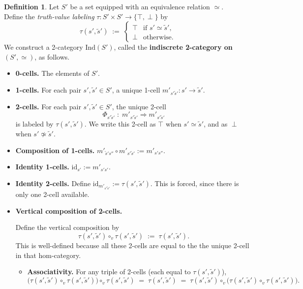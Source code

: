 \documentclass[a4paper,10pt]{article}
\theoremstyle{plain}
\theoremstyle{definition}
\newtheorem{definition}[theorem]{Definition}
\theoremstyle{remark}
\newcommand{\Top}{\top}
\newcommand{\Bot}{\perp}
\newcommand{\vsim}{\simeq}
\newcommand{\cmp}{\circ}
\newcommand{\vv}{\circ_{v}}
\newcommand{\cc}[2]{m'_{#1 #2}}
\begin{document}
\begin{definition}
  Let $S'$ be a set equipped with an equivalence relation $\vsim$. \\
  Define the
  \emph{truth-value labeling} $\tau : S' \times S' \to \{\Top, \Bot\}$ by
  \[
    \tau(s', \tilde{s}') \;:=\;
    \begin{cases}
      \Top & \text{if } s' \vsim \tilde{s}', \\
      \Bot & \text{otherwise.}
    \end{cases}
  \]
  We construct a 2-category $\mathrm{Ind}(S')$, called the
  \textbf{indiscrete 2-category on $(S',\vsim)$}, as follows.
  \begin{itemize}
    \item \textbf{0-cells.} The elements of $S'$.
    \item \textbf{1-cells.} For each pair $s', \tilde{s}' \in S'$, a unique
          1-cell $\cc{s'}{\tilde{s}'} : s' \to \tilde{s}'$.
    \item \textbf{2-cells.} For each pair $s', \tilde{s}' \in S'$, the unique
          2-cell
          \[
            \Phi_{s'\tilde{s}'} \;:\; \cc{s'}{\tilde{s}'} \Rightarrow
            \cc{s'}{\tilde{s}'}
          \]
          is labeled by $\tau(s', \tilde{s}')$. We write this 2-cell as $\Top$ when
          $s' \vsim \tilde{s}'$, and as $\Bot$ when $s' \not\vsim \tilde{s}'$.
    \item \textbf{Composition of 1-cells.}
          $\cc{\tilde{s}'}{s''} \cmp \cc{s'}{\tilde{s}'} := \cc{s'}{s''}$.
    \item \textbf{Identity 1-cells.}
          $\mathrm{id}_{s'} := \cc{s'}{s'}$.

    \item \textbf{Identity 2-cells.} Define $\mathrm{id}_{\cc{s'}{\tilde{s}'}} :=
            \tau(s', \tilde{s}')$. This is forced, since there is only one 2-cell
          available.

    \item \textbf{Vertical composition of 2-cells.} 
          
    Define the vertical composition by
          \[
            \tau(s', \tilde{s}') \vv \tau(s', \tilde{s}') \;:=\; \tau(s', \tilde{s}').
          \]
          This is well-defined because all these 2-cells are equal to the the unique 2-cell in that hom-category.

          \begin{itemize}

            \item \textbf{Associativity.} For any triple of 2-cells (each equal to
          $\tau(s', \tilde{s}')$),
          \[
            \bigl(\tau(s',\tilde{s}') \vv \tau(s',\tilde{s}')\bigr) \vv \tau(s',\tilde{s}')
            \;=\; \tau(s',\tilde{s}')
            \;=\; \tau(s',\tilde{s}') \vv \bigl(\tau(s',\tilde{s}') \vv
            \tau(s',\tilde{s}')\bigr). \;
          \]


\end{itemize}
\end{itemize}
\end{definition}
\end{document}
